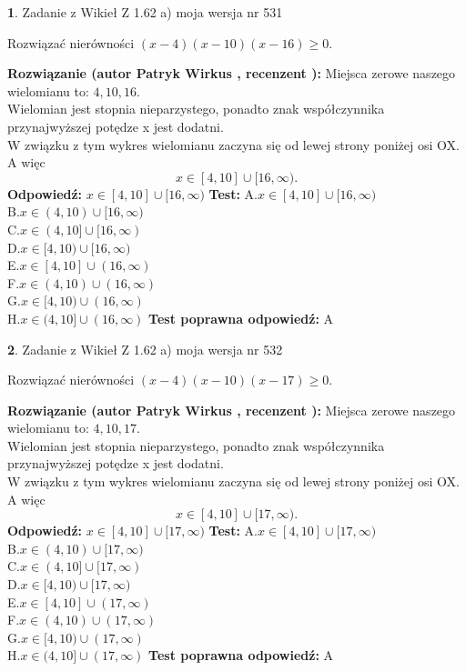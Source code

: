 \documentclass[12pt, a4paper]{article}
\theoremstyle{definition} %
\newtheorem{zad}{}
\newcommand{\zadStart}[1]{\begin{zad}#1\newline}
\newcommand{\zadStop}{\end{zad}}
\newcommand{\rozwStart}[2]{\noindent \textbf{Rozwiązanie (autor #1 , recenzent #2): }\newline}
\newcommand{\rozwStop}{\newline}
\newcommand{\odpStart}{\noindent \textbf{Odpowiedź:}\newline}
\newcommand{\odpStop}{\newline}
\newcommand{\testStart}{\noindent \textbf{Test:}\newline}
\newcommand{\testStop}{\newline}
\newcommand{\kluczStart}{\noindent \textbf{Test poprawna odpowiedź:}\newline}
\newcommand{\kluczStop}{\newline}
\begin{document}
\zadStart{Zadanie z Wikieł Z 1.62 a) moja wersja nr 531}

Rozwiązać nierówności $(x-4)(x-10)(x-16)\ge0$.
\zadStop
\rozwStart{Patryk Wirkus}{}
Miejsca zerowe naszego wielomianu to: $4, 10, 16$.\\
Wielomian jest stopnia nieparzystego, ponadto znak współczynnika przy\linebreak najwyższej potędze x jest dodatni.\\ W związku z tym wykres wielomianu zaczyna się od lewej strony poniżej osi OX. A więc $$x \in [4,10] \cup [16,\infty).$$
\rozwStop
\odpStart
$x \in [4,10] \cup [16,\infty)$
\odpStop
\testStart
A.$x \in [4,10] \cup [16,\infty)$\\
B.$x \in (4,10) \cup [16,\infty)$\\
C.$x \in (4,10] \cup [16,\infty)$\\
D.$x \in [4,10) \cup [16,\infty)$\\
E.$x \in [4,10] \cup (16,\infty)$\\
F.$x \in (4,10) \cup (16,\infty)$\\
G.$x \in [4,10) \cup (16,\infty)$\\
H.$x \in (4,10] \cup (16,\infty)$
\testStop
\kluczStart
A
\kluczStop



\zadStart{Zadanie z Wikieł Z 1.62 a) moja wersja nr 532}

Rozwiązać nierówności $(x-4)(x-10)(x-17)\ge0$.
\zadStop
\rozwStart{Patryk Wirkus}{}
Miejsca zerowe naszego wielomianu to: $4, 10, 17$.\\
Wielomian jest stopnia nieparzystego, ponadto znak współczynnika przy\linebreak najwyższej potędze x jest dodatni.\\ W związku z tym wykres wielomianu zaczyna się od lewej strony poniżej osi OX. A więc $$x \in [4,10] \cup [17,\infty).$$
\rozwStop
\odpStart
$x \in [4,10] \cup [17,\infty)$
\odpStop
\testStart
A.$x \in [4,10] \cup [17,\infty)$\\
B.$x \in (4,10) \cup [17,\infty)$\\
C.$x \in (4,10] \cup [17,\infty)$\\
D.$x \in [4,10) \cup [17,\infty)$\\
E.$x \in [4,10] \cup (17,\infty)$\\
F.$x \in (4,10) \cup (17,\infty)$\\
G.$x \in [4,10) \cup (17,\infty)$\\
H.$x \in (4,10] \cup (17,\infty)$
\testStop
\kluczStart
A
\kluczStop
\end{document}
